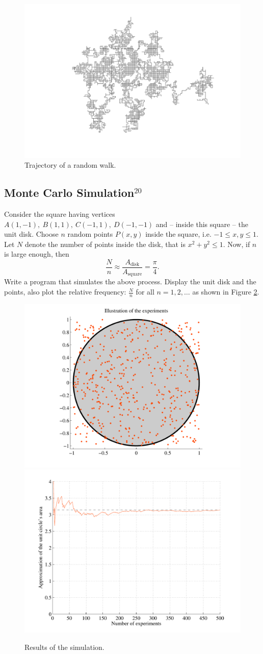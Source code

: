 \documentclass[a4paper, fleqn, 10pt]{report}
\theoremstyle{definition}
\begin{document}
\begin{figure}[ht!]
\centering
\includegraphics[width=0.5\linewidth]{rwFig}
\caption{Trajectory of a random walk.}\label{fig:rw}
\end{figure}

\subsection*{Monte Carlo Simulation$^{20}$}
Consider the square having vertices $A(1,-1),\: B(1,1),\: C(-1,1),\: D(-1,-1)$ and -- inside this square -- the unit disk.
Choose $n$ random points $P(x,y)$ inside the square, i.e. $-1\le x,y \le 1.$
Let $N$ denote the number of points inside the disk, that is $x^2+y^2\le 1.$
Now, if $n$ is large enough, then
\[\frac{N}{n} \approx \frac{A_{\text{disk}}}{A_{\text{square}}} = \frac{\pi}{4}.\]
Write a program that simulates the above process.
Display the unit disk and the points, also plot the relative frequency: $\frac{N}{n}$ for
all $n=1,2,\dots$ as shown in Figure \ref{fig:mc}.

\begin{figure}[ht!]
\centering
\includegraphics[width=0.48\linewidth]{mcFig1}
\includegraphics[width=0.48\linewidth]{mcFig2}
\caption{Results of the simulation.}\label{fig:mc}
\end{figure}
\end{document}
